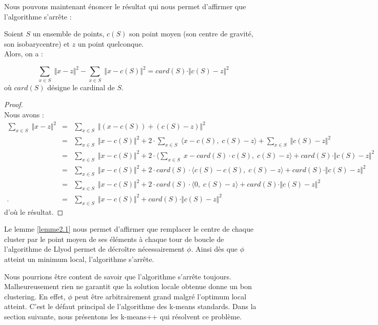 \documentclass[12pt,a4paper]{book}
\newcommand{\1}{\mathds{1}}
\begin{document}
Nous pouvons maintenant énoncer le résultat qui nous permet d'affirmer que l'algorithme s'arrête :

	\begin{env_lemme}\label{lemme2.1}
		Soient $S$ un ensemble de points, $c(S)$ son point moyen (son centre de gravité, son isobarycentre) et $z$ un point quelconque.\\
		Alors, on a :
		
		$$
			\sum_{x \in S} \; \Vert x-z \Vert^2 - \sum_{x \in S} \; \Vert x-c(S) \Vert^2 = card(S) \cdot \Vert c(S)-z \Vert^2
		$$
		où $card(S)$ désigne le cardinal de $S$.
	\end{env_lemme}	
	
	\begin{proof}
		~\\
		Nous avons :
		\begin{eqnarray*}
			\sum_{x \in S} \; \Vert x-z \Vert^2 &=& \sum_{x \in S} \; \Vert \left( x - c(S) \right) + \left( c(S)- z \right) \Vert^2 \\
			& = & \sum_{x \in S} \; \Vert x - c(S) \Vert^2 + 2 \cdot \sum_{x \in S} \; \langle x - c(S), \; c(S)- z \rangle + \sum_{x \in S} \; \Vert c(S)- z \Vert^2 \\
			& = & \sum_{x \in S} \; \Vert x - c(S) \Vert^2 + 2 \cdot \langle \sum_{x \in S} \; x - card(S) \cdot c(S), \; c(S)- z \rangle + card(S) \cdot \Vert c(S)- z \Vert^2 \\
			& = & \sum_{x \in S} \; \Vert x - c(S) \Vert^2 + 2 \cdot card(S) \cdot \langle c(S) - c(S), \; c(S)- z \rangle + card(S) \cdot \Vert c(S)- z \Vert^2 \\
			& = & \sum_{x \in S} \; \Vert x - c(S) \Vert^2 + 2 \cdot card(S) \cdot \langle 0, \; c(S)- z \rangle + card(S) \cdot\Vert c(S)- z \Vert^2 \\.
			& = & \sum_{x \in S} \; \Vert x - c(S) \Vert^2 + card(S) \cdot \Vert c(S)- z \Vert^2
		\end{eqnarray*}
		d'où le résultat.
	\end{proof}

Le lemme \ref{lemme2.1} nous permet d'affirmer que remplacer le centre de chaque cluster par le point moyen de ses éléments à chaque tour de boucle de l'algorithme de Llyod permet de décroître nécessairement $\phi$. Ainsi dès que $\phi$ atteint un minimum local, l'algorithme s'arrête.

Nous pourrions être content de savoir que l'algorithme s'arrête toujours. Malheureusement rien ne garantit que la solution locale obtenue donne un bon clustering. En effet, $\phi$  peut être arbitrairement grand malgré l'optimum local atteint. C'est le défaut principal de l'algorithme des k-means standards. Dans la section suivante, nous présentons les k-means++ qui résolvent ce problème.
\end{document}
